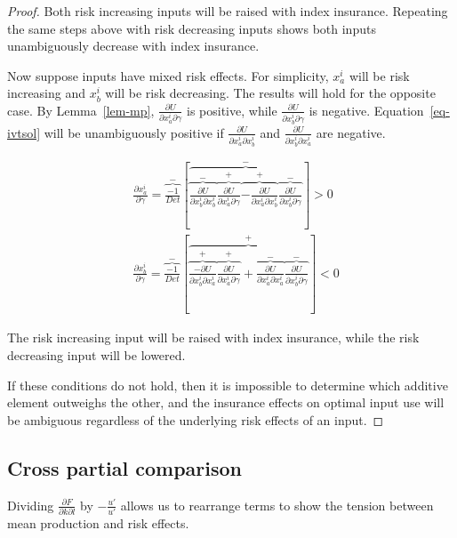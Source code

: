 \documentclass[
  letterpaper,
  DIV=11,
  numbers=noendperiod]{scrartcl}
\theoremstyle{plain}
\theoremstyle{plain}
\theoremstyle{remark}
\begin{document}
\begin{proof}
Both risk increasing inputs will be raised with index insurance.
Repeating the same steps above with risk decreasing inputs shows both
inputs unambiguously decrease with index insurance.

Now suppose inputs have mixed risk effects. For simplicity, \(x^i_a\)
will be risk increasing and \(x^i_b\) will be risk decreasing. The
results will hold for the opposite case. By Lemma~\ref{lem-mp},
\(\frac{\partial U}{\partial x^i_a\partial \gamma}\) is positive, while
\(\frac{\partial U}{\partial x^i_b\partial \gamma}\) is negative.
Equation~\ref{eq-ivtsol} will be unambiguously positive if
\(\frac{\partial U}{\partial x^i_a\partial x^i_b}\) and
\(\frac{\partial U}{\partial x^i_b\partial x^i_a}\) are negative.

\[
\begin{aligned}
&\frac{\partial x^i_a}{\partial \gamma}=\overbrace{\frac{-1}{Det}}^{-}\left[\overbrace{\overbrace{\frac{\partial U}{\partial x^i_b\partial x^i_b}}^{-}\overbrace{\frac{\partial U}{\partial x^i_a \partial \gamma}}^{+}\overbrace{-\frac{\partial U}{\partial x^i_a \partial x^i_b}}^{+}\overbrace{\frac{\partial U}{\partial x^i_b\partial \gamma}}^{-}}^{-}\right] >0\\
&\frac{\partial x^i_b}{\partial \gamma}=\overbrace{\frac{-1}{Det}}^{-}\left[\overbrace{\overbrace{\frac{-\partial U}{\partial x^i_b\partial x^i_a}}^{+}\overbrace{\frac{\partial U}{\partial x^i_a \partial \gamma}}^{+}+\overbrace{\frac{\partial U}{\partial x^i_a \partial x^i_a}}^{-}\overbrace{\frac{\partial U}{\partial x^i_b\partial \gamma}}^{-}}^{+}\right]<0
\end{aligned}
\]

The risk increasing input will be raised with index insurance, while the
risk decreasing input will be lowered.

If these conditions do not hold, then it is impossible to determine
which additive element outweighs the other, and the insurance effects on
optimal input use will be ambiguous regardless of the underlying risk
effects of an input.

\end{proof}

\hypertarget{cross-partial-comparison}{%
\subsection{Cross partial comparison}\label{cross-partial-comparison}}

Dividing \(\frac{\partial F}{\partial k\partial l}\) by
\(-\frac{u'}{u'}\) allows us to rearrange terms to show the tension
between mean production and risk effects.
\end{document}
